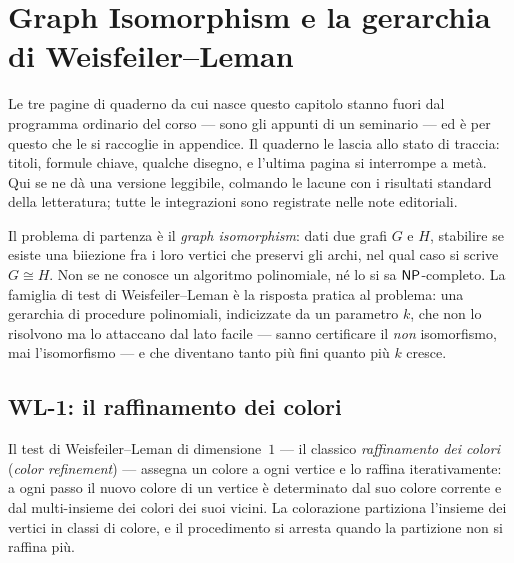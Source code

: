 \chapter{Graph Isomorphism e la gerarchia di Weisfeiler--Leman}


Le tre pagine di quaderno da cui nasce questo capitolo stanno fuori dal programma
ordinario del corso --- sono gli appunti di un seminario --- ed è per questo che le si
raccoglie in appendice. Il quaderno le lascia allo stato di traccia: titoli, formule
chiave, qualche disegno, e l'ultima pagina si interrompe a metà. Qui se ne dà una
versione leggibile, colmando le lacune con i risultati standard della letteratura;
tutte le integrazioni sono registrate nelle note editoriali.

Il problema di partenza è il \emph{graph isomorphism}: dati due grafi $G$ e $H$,
stabilire se esiste una biiezione fra i loro vertici che preservi gli archi, nel qual
caso si scrive $G \cong H$. Non se ne conosce un algoritmo polinomiale, né lo si sa
$\mathsf{NP}$-completo. La famiglia di test di Weisfeiler--Leman è la risposta pratica al
problema: una gerarchia di procedure polinomiali, indicizzate da un parametro $k$, che
non lo risolvono ma lo attaccano dal lato facile --- sanno certificare il \emph{non}
isomorfismo, mai l'isomorfismo --- e che diventano tanto più fini quanto più $k$ cresce.

\section{WL-1: il raffinamento dei colori}


Il test di Weisfeiler--Leman di dimensione~$1$ --- il classico \emph{raffinamento dei
colori} (\emph{color refinement}) --- assegna un colore a ogni vertice e lo raffina
iterativamente: a ogni passo il nuovo colore di un vertice è determinato dal suo colore
corrente e dal multi-insieme dei colori dei suoi vicini. La colorazione partiziona
l'insieme dei vertici in classi di colore, e il procedimento si arresta quando la
partizione non si raffina più.


